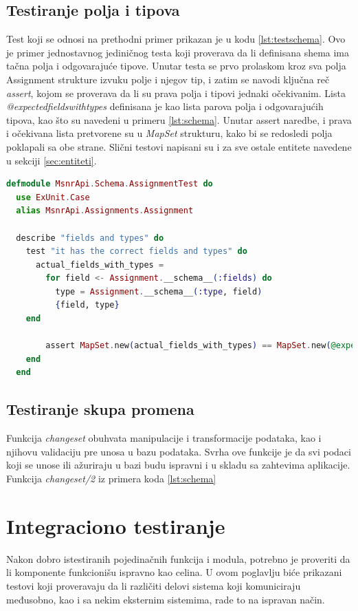 \documentclass[12pt,oneside]{memoir}
\begin{document}
\subsection{Testiranje polja i tipova}
\par Test koji se odnosi na prethodni primer prikazan je u kodu \ref{lst:testschema}. Ovo je primer jednostavnog jediničnog testa koji proverava da li definisana shema ima tačna polja i odgovarajuće tipove. Unutar testa se prvo prolaskom kroz sva polja Assignment strukture izvuku polje i njegov tip, i zatim se navodi ključna reč \emph{assert}, kojom se proverava da li su prava polja i tipovi jednaki očekivanim. Lista \emph{@expected{\textunderscore}fields{\textunderscore}with{\textunderscore}types} definisana je kao lista parova polja i odgovarajućih tipova, kao što su navedeni u primeru \ref{lst:schema}. Unutar assert naredbe, i prava i očekivana lista pretvorene su u \emph{MapSet} strukturu, kako bi se redosledi polja poklapali sa obe strane. Slični testovi napisani su i za sve ostale entitete navedene u sekciji \ref{sec:entiteti}.

\begin{lstlisting}[language=elixir, caption={Test za proveru polja i tipova tabele assignments},captionpos=b, label={lst:testschema}]
defmodule MsnrApi.Schema.AssignmentTest do
  use ExUnit.Case
  alias MsnrApi.Assignments.Assignment
  
  describe "fields and types" do
    test "it has the correct fields and types" do
      actual_fields_with_types =
        for field <- Assignment.__schema__(:fields) do
          type = Assignment.__schema__(:type, field)
          {field, type}
    end
    
        assert MapSet.new(actual_fields_with_types) == MapSet.new(@expected_fields_with_types)
    end
  end
\end{lstlisting}


\subsection{Testiranje skupa promena}
\par Funkcija \emph{changeset} obuhvata manipulacije i transformacije podataka, kao i njihovu validaciju pre unosa u bazu podataka. Svrha ove funkcije je da svi podaci koji se unose ili ažuriraju u bazi budu ispravni i u skladu sa zahtevima aplikacije. Funkcija \emph{changeset/2} iz primera koda \ref{lst:schema} 


\section{Integraciono testiranje}
\label{sec:elixint}
\par Nakon dobro istestiranih pojedinačnih funkcija i modula, potrebno je proveriti da li komponente funkcionišu ispravno kao celina. U ovom poglavlju biće prikazani testovi koji proveravaju da li različiti delovi sistema koji komuniciraju međusobno, kao i sa nekim eksternim sistemima, rade to na ispravan način.
\end{document}
